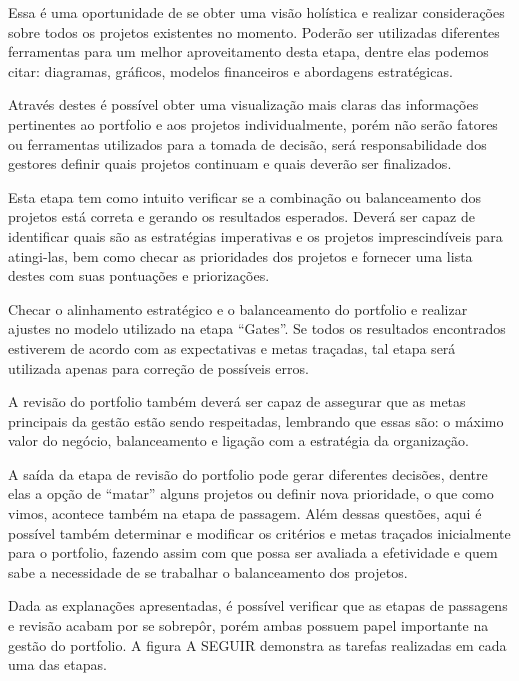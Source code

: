 \documentclass[12pt,a4paper,ruledheader,tocpage=prefix,floatnumber=continuous,pagestart=folhaderosto,font=times]{abnt}
\begin{document}
Essa é uma oportunidade de se obter uma visão holística e realizar considerações sobre todos os projetos existentes no momento. Poderão ser utilizadas 
diferentes ferramentas para um melhor aproveitamento desta etapa, dentre elas podemos citar: diagramas, gráficos, modelos financeiros e abordagens 
estratégicas.

Através destes é possível obter uma visualização mais claras das informações pertinentes ao portfolio e aos projetos individualmente, 
porém não serão fatores ou ferramentas utilizados para a tomada de decisão, será responsabilidade dos gestores definir quais projetos continuam e quais 
deverão ser finalizados.

Esta etapa tem como intuito verificar se a combinação ou balanceamento dos projetos está correta e gerando os resultados esperados. Deverá ser capaz de
identificar quais são as estratégias imperativas e os projetos imprescindíveis para atingi-las, bem como checar as prioridades dos projetos e fornecer uma
lista destes com suas pontuações e priorizações. 

Checar o alinhamento estratégico e o balanceamento do portfolio e realizar ajustes no modelo utilizado na etapa ``Gates''. Se todos os resultados 
encontrados estiverem de acordo com as expectativas e metas traçadas, tal etapa será utilizada apenas para correção de possíveis erros. 

A revisão do portfolio também deverá ser capaz de assegurar que as metas principais da gestão estão sendo respeitadas, lembrando que 
essas são: o máximo valor do negócio, balanceamento e ligação com a estratégia da organização.

A saída da etapa de revisão do portfolio pode gerar diferentes decisões, dentre elas a opção de ``matar'' alguns projetos ou definir nova prioridade, o que
como vimos, acontece também na etapa de passagem. Além dessas questões, aqui é possível também determinar e modificar os critérios e metas traçados inicialmente
para o portfolio, fazendo assim com que possa ser avaliada a efetividade e quem sabe a necessidade de se trabalhar o balanceamento dos projetos.

Dada as explanações apresentadas, é possível verificar que as etapas de passagens e revisão acabam por se sobrepôr, porém ambas possuem papel
importante na gestão do portfolio. A figura A SEGUIR demonstra as tarefas realizadas em cada uma das etapas.
\end{document}
